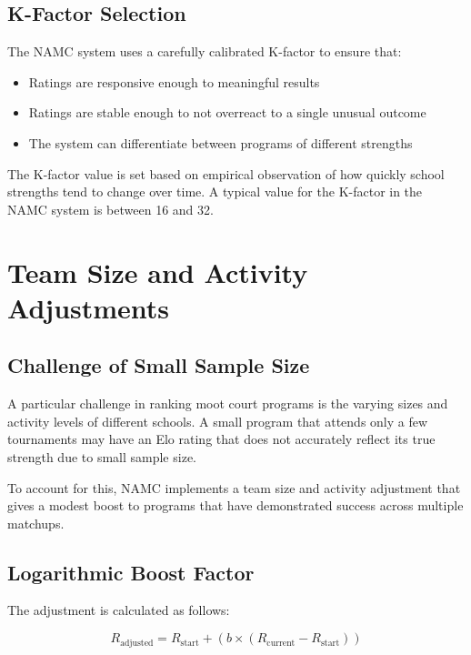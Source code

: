 \documentclass[11pt]{article}
\begin{document}
\subsection{K-Factor Selection}

The NAMC system uses a carefully calibrated K-factor to ensure that:
\begin{itemize}
    \item Ratings are responsive enough to meaningful results
    \item Ratings are stable enough to not overreact to a single unusual outcome
    \item The system can differentiate between programs of different strengths
\end{itemize}

The K-factor value is set based on empirical observation of how quickly school strengths tend to change over time. A typical value for the K-factor in the NAMC system is between 16 and 32.

\section{Team Size and Activity Adjustments}

\subsection{Challenge of Small Sample Size}

A particular challenge in ranking moot court programs is the varying sizes and activity levels of different schools. A small program that attends only a few tournaments may have an Elo rating that does not accurately reflect its true strength due to small sample size.

To account for this, NAMC implements a team size and activity adjustment that gives a modest boost to programs that have demonstrated success across multiple matchups.

\subsection{Logarithmic Boost Factor}

The adjustment is calculated as follows:

\begin{equation}
R_{\text{adjusted}} = R_{\text{start}} + (b \times (R_{\text{current}} - R_{\text{start}}))
\end{equation}
\end{document}
